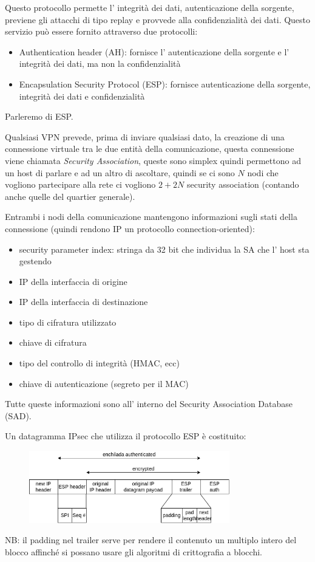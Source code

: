 Questo protocollo permette l' integrità dei dati, autenticazione della sorgente, previene gli attacchi di tipo replay e provvede alla confidenzialità dei dati.
Questo servizio può essere fornito attraverso due protocolli:
\begin{itemize}
    \item Authentication header (AH): fornisce l' autenticazione della sorgente e l' integrità dei dati, ma non la confidenzialità
    \item Encapsulation Security Protocol (ESP): fornisce autenticazione della sorgente, integrità dei dati e confidenzialità
\end{itemize}
Parleremo di ESP.

Qualsiasi VPN prevede, prima di inviare qualsiasi dato, la creazione di una connessione virtuale tra le due entità della comunicazione, questa connessione viene chiamata \emph{Security Association}, queste sono simplex quindi permettono ad un host di parlare e ad un altro di ascoltare, quindi se ci sono $N$ nodi che vogliono partecipare alla rete ci vogliono $2 + 2N$ security association (contando anche quelle del quartier generale).

Entrambi i nodi della comunicazione mantengono informazioni sugli stati della connessione (quindi rendono IP un protocollo connection-oriented):
\begin{itemize}
    \item security parameter index: stringa da 32 bit che individua la SA che l' host sta gestendo
    \item IP della interfaccia di origine
    \item IP della interfaccia di destinazione
    \item tipo di cifratura utilizzato
    \item chiave di cifratura
    \item tipo del controllo di integrità (HMAC, ecc)
    \item chiave di autenticazione (segreto per il MAC)
\end{itemize}
Tutte queste informazioni sono all' interno del Security Association Database (SAD).

Un datagramma IPsec che utilizza il protocollo ESP è costituito:
\begin{figure}[H]
    \centering
    \includegraphics[width=330px]{images/7_Security/IPsec_datagram.png}
\end{figure}
NB: il padding nel trailer serve per rendere il contenuto un multiplo intero del blocco affinché si possano usare gli algoritmi di crittografia a blocchi.

